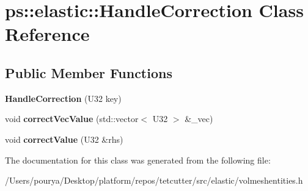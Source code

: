 \hypertarget{classps_1_1elastic_1_1HandleCorrection}{}\section{ps\+:\+:elastic\+:\+:Handle\+Correction Class Reference}
\label{classps_1_1elastic_1_1HandleCorrection}
\subsection*{Public Member Functions}
\begin{DoxyCompactItemize}
\item 
\hypertarget{classps_1_1elastic_1_1HandleCorrection_a14d349e73a240cda6e4b55865f2dad03}{}{\bfseries Handle\+Correction} (U32 key)\label{classps_1_1elastic_1_1HandleCorrection_a14d349e73a240cda6e4b55865f2dad03}

\item 
\hypertarget{classps_1_1elastic_1_1HandleCorrection_a878dfb77b6725fdf8d7beec4981d6bef}{}void {\bfseries correct\+Vec\+Value} (std\+::vector$<$ U32 $>$ \&\+\_\+vec)\label{classps_1_1elastic_1_1HandleCorrection_a878dfb77b6725fdf8d7beec4981d6bef}

\item 
\hypertarget{classps_1_1elastic_1_1HandleCorrection_a06cdcfa94df46eafd1e9834919b76679}{}void {\bfseries correct\+Value} (U32 \&rhs)\label{classps_1_1elastic_1_1HandleCorrection_a06cdcfa94df46eafd1e9834919b76679}

\end{DoxyCompactItemize}


The documentation for this class was generated from the following file\+:\begin{DoxyCompactItemize}
\item 
/\+Users/pourya/\+Desktop/platform/repos/tetcutter/src/elastic/volmeshentities.\+h\end{DoxyCompactItemize}
